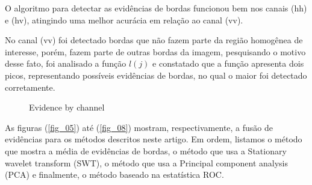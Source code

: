 \documentclass[conference]{IEEEtran}
\begin{document}
O algoritmo para detectar as evidências de bordas funcionou bem nos canais (hh) e (hv), atingindo uma melhor acurácia em relação ao canal (vv).  

No canal (vv) foi detectado bordas que não fazem parte da região homogênea de interesse, porém, fazem parte de outras bordas da imagem, pesquisando o motivo desse fato, foi analisado a função $l(j)$ e constatado que a função apresenta dois picos, representando possíveis evidências de bordas, no qual o maior foi detectado corretamente. 
 
\begin{figure}[hbt]
	\centering
     \qquad
     \qquad
    \caption{Evidence by channel}
     \label{fig11}
   \end{figure}	



As figuras (\ref{fig_05}) até (\ref{fig_08}) mostram, respectivamente, a fusão de evidências para os métodos descritos neste artigo. Em ordem, listamos o método que mostra a média de evidências de bordas, o método que usa a Stationary wavelet transform (SWT), o método que usa a Principal component analysis (PCA) e finalmente, o método baseado na estatística ROC.
\end{document}
